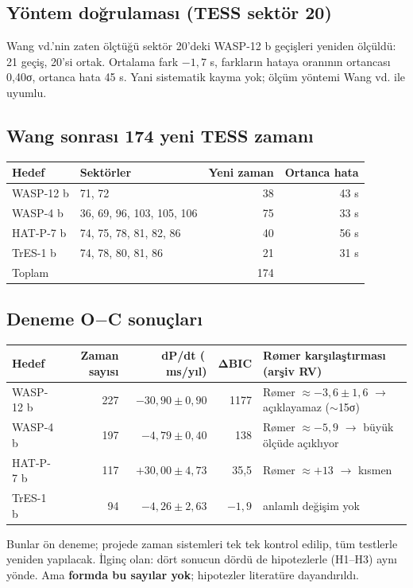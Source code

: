 \documentclass[11pt,a4paper]{article}
\newcommand{\OC}{O$-$C}
\newcommand{\msyil}{\,ms/yıl}
\begin{document}
\subsection{Yöntem doğrulaması (TESS sektör 20)}
Wang vd.'nin zaten ölçtüğü sektör 20'deki WASP-12 b geçişleri yeniden ölçüldü: 21 geçiş, 20'si ortak. Ortalama fark $-1{,}7$ s, farkların hataya oranının ortancası 0,40σ, ortanca hata 45 s. Yani sistematik kayma yok; ölçüm yöntemi Wang vd. ile uyumlu.

\subsection{Wang sonrası 174 yeni TESS zamanı}
\begin{center}
\begin{tabular}{@{}llrr@{}}
\toprule
Hedef & Sektörler & Yeni zaman & Ortanca hata \\ \midrule
WASP-12 b & 71, 72 & 38 & 43 s \\
WASP-4 b & 36, 69, 96, 103, 105, 106 & 75 & 33 s \\
HAT-P-7 b & 74, 75, 78, 81, 82, 86 & 40 & 56 s \\
TrES-1 b & 74, 78, 80, 81, 86 & 21 & 31 s \\ \midrule
Toplam & & 174 & \\ \bottomrule
\end{tabular}
\end{center}

\subsection{Deneme \OC{} sonuçları}
\begin{center}\small
\begin{tabular}{@{}lrrrl@{}}
\toprule
Hedef & Zaman sayısı & dP/dt (\msyil) & ΔBIC & Rømer karşılaştırması (arşiv RV) \\ \midrule
WASP-12 b & 227 & $-30{,}90\pm0{,}90$ & 1177 & Rømer $\approx -3{,}6\pm1{,}6$ $\rightarrow$ açıklayamaz ($\sim$15σ) \\
WASP-4 b & 197 & $-4{,}79\pm0{,}40$ & 138 & Rømer $\approx -5{,}9$ $\rightarrow$ büyük ölçüde açıklıyor \\
HAT-P-7 b & 117 & $+30{,}00\pm4{,}73$ & 35,5 & Rømer $\approx +13$ $\rightarrow$ kısmen \\
TrES-1 b & 94 & $-4{,}26\pm2{,}63$ & $-1{,}9$ & anlamlı değişim yok \\ \bottomrule
\end{tabular}
\end{center}
Bunlar ön deneme; projede zaman sistemleri tek tek kontrol edilip, tüm testlerle yeniden yapılacak. İlginç olan: dört sonucun dördü de hipotezlerle (H1--H3) aynı yönde. Ama \textbf{formda bu sayılar yok}; hipotezler literatüre dayandırıldı.
\end{document}
